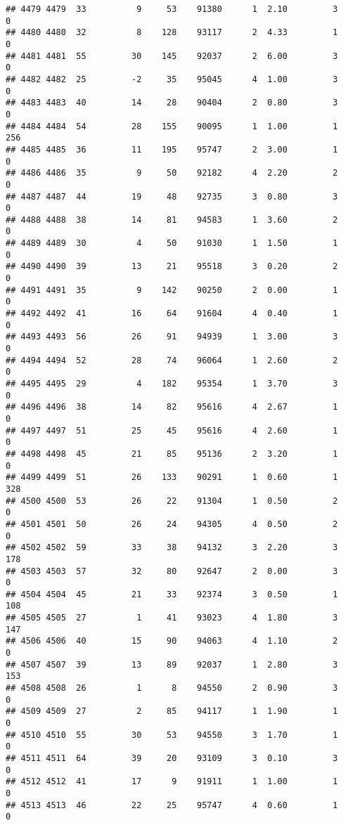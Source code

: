 \documentclass[
]{article}
\begin{document}
\begin{verbatim}
## 4479 4479  33          9     53    91380      1  2.10         3        0
## 4480 4480  32          8    128    93117      2  4.33         1        0
## 4481 4481  55         30    145    92037      2  6.00         3        0
## 4482 4482  25         -2     35    95045      4  1.00         3        0
## 4483 4483  40         14     28    90404      2  0.80         3        0
## 4484 4484  54         28    155    90095      1  1.00         1      256
## 4485 4485  36         11    195    95747      2  3.00         1        0
## 4486 4486  35          9     50    92182      4  2.20         2        0
## 4487 4487  44         19     48    92735      3  0.80         3        0
## 4488 4488  38         14     81    94583      1  3.60         2        0
## 4489 4489  30          4     50    91030      1  1.50         1        0
## 4490 4490  39         13     21    95518      3  0.20         2        0
## 4491 4491  35          9    142    90250      2  0.00         1        0
## 4492 4492  41         16     64    91604      4  0.40         1        0
## 4493 4493  56         26     91    94939      1  3.00         3        0
## 4494 4494  52         28     74    96064      1  2.60         2        0
## 4495 4495  29          4    182    95354      1  3.70         3        0
## 4496 4496  38         14     82    95616      4  2.67         1        0
## 4497 4497  51         25     45    95616      4  2.60         1        0
## 4498 4498  45         21     85    95136      2  3.20         1        0
## 4499 4499  51         26    133    90291      1  0.60         1      328
## 4500 4500  53         26     22    91304      1  0.50         2        0
## 4501 4501  50         26     24    94305      4  0.50         2        0
## 4502 4502  59         33     38    94132      3  2.20         3      178
## 4503 4503  57         32     80    92647      2  0.00         3        0
## 4504 4504  45         21     33    92374      3  0.50         1      108
## 4505 4505  27          1     41    93023      4  1.80         3      147
## 4506 4506  40         15     90    94063      4  1.10         2        0
## 4507 4507  39         13     89    92037      1  2.80         3      153
## 4508 4508  26          1      8    94550      2  0.90         3        0
## 4509 4509  27          2     85    94117      1  1.90         1        0
## 4510 4510  55         30     53    94550      3  1.70         1        0
## 4511 4511  64         39     20    93109      3  0.10         3        0
## 4512 4512  41         17      9    91911      1  1.00         1        0
## 4513 4513  46         22     25    95747      4  0.60         1        0

\end{verbatim}
\end{document}
